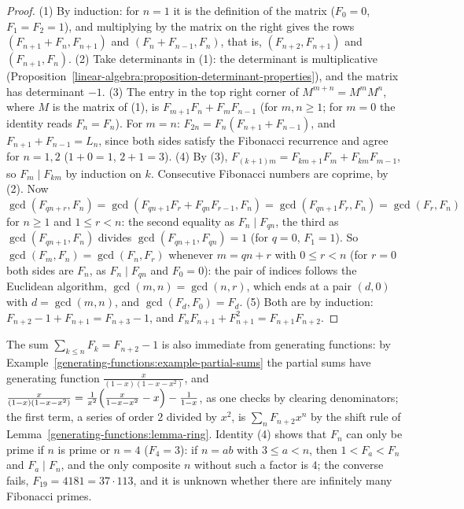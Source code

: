 \begin{proof}
(1) By induction: for $n = 1$ it is the definition of the matrix ($F_0 = 0$, $F_1 = F_2 = 1$), and multiplying by the matrix on the right gives the rows $(F_{n+1} + F_n, F_{n+1})$ and
$(F_n + F_{n-1}, F_n)$, that is, $(F_{n+2}, F_{n+1})$ and $(F_{n+1}, F_n)$.
(2) Take determinants in (1): the determinant is multiplicative (Proposition~\ref{linear-algebra:proposition-determinant-properties}), and the matrix has determinant $-1$.
(3) The entry in the top right corner of $M^{m+n} = M^mM^n$, where $M$ is the matrix of (1), is $F_{m+1}F_n + F_mF_{n-1}$ (for $m, n \geq 1$; for $m = 0$ the identity reads $F_n = F_n$).
For $m = n$: $F_{2n} = F_n(F_{n+1} + F_{n-1})$, and $F_{n+1} + F_{n-1} = L_n$, since both sides satisfy the Fibonacci recurrence and agree for $n = 1, 2$ ($1 + 0 = 1$, $2 + 1 = 3$).
(4) By (3), $F_{(k+1)m} = F_{km+1}F_m + F_{km}F_{m-1}$, so $F_m \mid F_{km}$ by induction on $k$. Consecutive Fibonacci numbers are coprime, by (2). Now
$\gcd(F_{qn+r}, F_n) = \gcd(F_{qn+1}F_r + F_{qn}F_{r-1}, F_n) = \gcd(F_{qn+1}F_r, F_n) = \gcd(F_r, F_n)$ for $n \geq 1$ and $1 \leq r < n$: the second equality as $F_n \mid F_{qn}$, the third as
$\gcd(F_{qn+1}, F_n)$ divides $\gcd(F_{qn+1}, F_{qn}) = 1$ (for $q = 0$, $F_1 = 1$). So $\gcd(F_m, F_n) = \gcd(F_n, F_r)$ whenever $m = qn + r$ with $0 \leq r < n$ (for $r = 0$ both sides are
$F_n$, as $F_n \mid F_{qn}$ and $F_0 = 0$): the pair of indices follows the Euclidean algorithm, $\gcd(m, n) = \gcd(n, r)$, which ends at a pair $(d, 0)$ with $d = \gcd(m, n)$, and
$\gcd(F_d, F_0) = F_d$.
(5) Both are by induction: $F_{n+2} - 1 + F_{n+1} = F_{n+3} - 1$, and $F_nF_{n+1} + F_{n+1}^2 = F_{n+1}F_{n+2}$.
\end{proof}

\begin{remark}\label{generating-functions:remark-fibonacci-generating}
The sum $\sum_{k \leq n}F_k = F_{n+2} - 1$ is also immediate from generating functions: by Example~\ref{generating-functions:example-partial-sums} the partial sums have generating function
$\frac{x}{(1 - x)(1 - x - x^2)}$, and $\frac{x}{(1 - x)(1 - x - x^2)} = \frac{1}{x^2}\Bigl(\frac{x}{1 - x - x^2} - x\Bigr) - \frac{1}{1 - x}$, as one checks by clearing denominators; the
first term, a series of order $2$ divided by $x^2$, is $\sum_nF_{n+2}x^n$ by the shift rule of Lemma~\ref{generating-functions:lemma-ring}. Identity (4) shows that
$F_n$ can only be prime if $n$ is prime or $n = 4$ ($F_4 = 3$): if $n = ab$ with $3 \leq a < n$, then $1 < F_a < F_n$ and $F_a \mid F_n$, and the only composite $n$ without such a factor is $4$; the converse fails, $F_{19} = 4181 = 37 \cdot 113$, and it is unknown whether there are infinitely many Fibonacci primes.
\end{remark}

